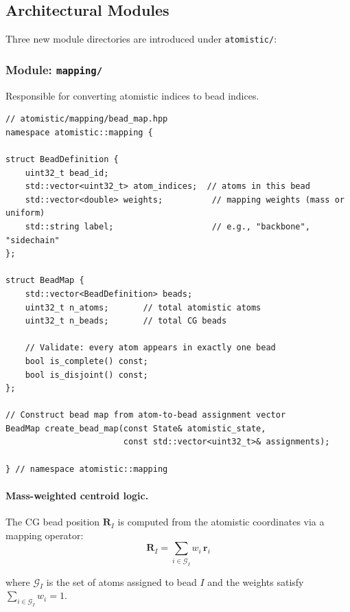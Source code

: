 \documentclass[11pt]{article}
\newcommand{\file}[1]{\texttt{#1}}
\begin{document}
\subsection{Architectural Modules}

Three new module directories are introduced under \file{atomistic/}:

\subsubsection{Module: \texttt{mapping/}}

Responsible for converting atomistic indices to bead indices.

\begin{lstlisting}
// atomistic/mapping/bead_map.hpp
namespace atomistic::mapping {

struct BeadDefinition {
    uint32_t bead_id;
    std::vector<uint32_t> atom_indices;  // atoms in this bead
    std::vector<double> weights;          // mapping weights (mass or uniform)
    std::string label;                    // e.g., "backbone", "sidechain"
};

struct BeadMap {
    std::vector<BeadDefinition> beads;
    uint32_t n_atoms;       // total atomistic atoms
    uint32_t n_beads;       // total CG beads

    // Validate: every atom appears in exactly one bead
    bool is_complete() const;
    bool is_disjoint() const;
};

// Construct bead map from atom-to-bead assignment vector
BeadMap create_bead_map(const State& atomistic_state,
                        const std::vector<uint32_t>& assignments);

} // namespace atomistic::mapping
\end{lstlisting}

\paragraph{Mass-weighted centroid logic.}

The CG bead position $\mathbf{R}_I$ is computed from the atomistic
coordinates via a mapping operator:
\begin{equation}
  \mathbf{R}_I = \sum_{i \in \mathcal{G}_I} w_i \, \mathbf{r}_i
  \label{eq:cg_mapping}
\end{equation}

where $\mathcal{G}_I$ is the set of atoms assigned to bead $I$ and the
weights satisfy $\sum_{i \in \mathcal{G}_I} w_i = 1$.
\end{document}
